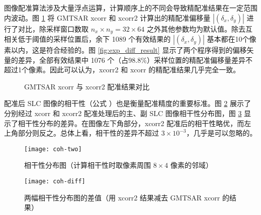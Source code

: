 图像配准算法涉及大量浮点运算，计算顺序上的不同会导致精配准结果在一定范围内波动。图 \ref{fig:exp_result} 将 GMTSAR xcorr 和 xcorr2 计算出的精配准偏移量 $|(\delta_x, \delta_y)|$ 进行了对比，除采样窗口数取 $n_x\times n_y = 32 \times 64$ 之外其他参数均为默认值。除去互相关低于阈值的采样位置后，余下 1089 个有效结果的 $|(\delta_x, \delta_y)|$ 基本都在10个像素以内，这是符合经验的。图 \ref{fig:exp_diff_result} 显示了两个程序得到的偏移矢量的差异，全部有效结果中 1076 个（占98.8\%）采样位置的精配准偏移量差异不超过1个像素。因此可以认为，xcorr2 和 xcorr 的精配准结果几乎完全一致。

\begin{figure}[htbp]
\centering
{}
\caption{GMTSAR xcorr 与 xcorr2 配准结果对比} \label{fig:exp_result}
\end{figure}

配准后 SLC 图像的相干性（公式 \label{eq:coherence}）也是衡量配准精度的重要标准。图 \ref{fig:coh-two} 展示了分别经过 xcorr 和 xcorr2 配准处理后的主、副 SLC 图像相干性分布图，图 \ref{fig:coh-diff} 显示了相干性分布的差异。在图像左下角部分，xcorr2 配准后的相干性略优，而左上角部分则反之。总体上看，相干性的差异不超过 $3 \times 10^{-3}$，几乎是可以忽略的。

\begin{figure}[htbp]
\centering
\texttt{[image: coh-two]}
\caption{相干性分布图（计算相干性时取像素周围 $8 \times 4$ 像素的邻域）} \label{fig:coh-two}
\end{figure}


\begin{figure}[htbp]
\centering
\texttt{[image: coh-diff]}
\caption{两幅相干性分布图的差值（用 xcorr2 结果减去 GMTSAR xcorr 的结果）} \label{fig:coh-diff}
\end{figure}
